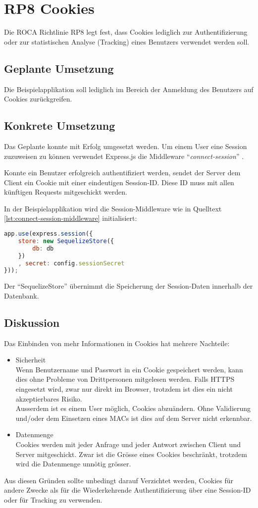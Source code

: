 \section{RP8 Cookies}
\label{sec:principle-rp8-cookies}
Die ROCA Richtlinie RP8 legt fest, dass Cookies lediglich zur Authentifizierung oder zur statistischen Analyse (Tracking) eines Benutzers verwendet werden soll.

\subsection*{Geplante Umsetzung}
Die Beispielapplikation soll lediglich im Bereich der Anmeldung des Benutzers auf Cookies zurückgreifen.

\subsection*{Konkrete Umsetzung}
Das Geplante konnte mit Erfolg umgesetzt werden.
Um einem User eine Session zuzuweisen zu können verwendet Express.js \cite{Expressjs} die \gls{Middleware} ``\emph{connect-session}'' \cite{ConnectSession}.

Konnte ein Benutzer erfolgreich authentifiziert werden, sendet der Server dem Client ein Cookie mit einer eindeutigen Session-ID. Diese ID muss mit allen künftigen Requests mitgeschickt werden.

In der Beispielapplikation wird die Session-Middleware wie in Quelltext \ref{lst:connect-session-middleware} initialisiert:

\begin{lstlisting}[language=JavaScript, caption=Connect Session Middleware \cite{RoomiesMiddlewareHttp}, label=lst:connect-session-middleware, firstnumber=31]
app.use(express.session({
	store: new SequelizeStore({
		db: db
	})
	, secret: config.sessionSecret
}));
\end{lstlisting}

Der ``SequelizeStore'' \cite{SequelizeStore} übernimmt die Speicherung der Session-Daten innerhalb der Datenbank.

\subsection*{Diskussion}
Das Einbinden von mehr Informationen in Cookies hat mehrere Nachteile:
\begin{itemize}
	\item Sicherheit \\
		Wenn Benutzername und Passwort in ein Cookie gespeichert werden, kann dies ohne Probleme von Drittpersonen mitgelesen werden. Falls HTTPS eingesetzt wird, zwar nur direkt im Browser, trotzdem ist dies ein nicht akzeptierbares Risiko. \\
		Ausserdem ist es einem User möglich, Cookies abzuändern. Ohne Validierung und/oder dem Einsetzen eines \glspl{MAC} ist dies auf dem Server nicht erkennbar.
	\item Datenmenge \\
		Cookies werden mit jeder Anfrage und jeder Antwort zwischen Client und Server mitgeschickt. Zwar ist die Grösse eines Cookies beschränkt, trotzdem wird die Datenmenge unnötig grösser.
\end{itemize}

Aus diesen Gründen sollte unbedingt darauf Verzichtet werden, Cookies für andere Zwecke als für die Wiederkehrende Authentifizierung über eine Session-ID oder für Tracking zu verwenden.